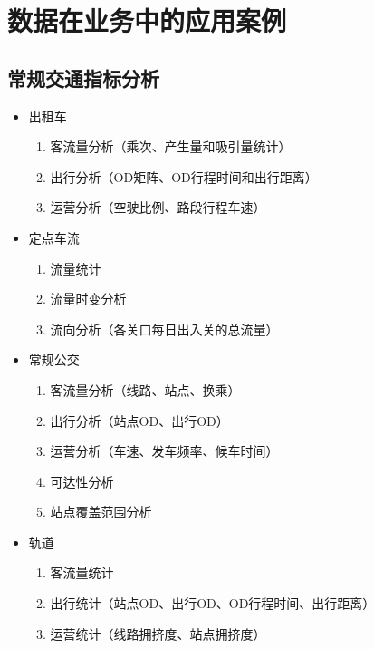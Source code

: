 
\section{数据在业务中的应用案例}

\subsection{常规交通指标分析}

\begin{frame}[t]{\subsecname}
  \begin{itemize}
     \item<1->出租车
        \begin{enumerate}
          \item 客流量分析（乘次、产生量和吸引量统计）
          \item 出行分析（OD矩阵、OD行程时间和出行距离）
          \item 运营分析（空驶比例、路段行程车速）
        \end{enumerate}
     \item<2->定点车流
        \begin{enumerate}
          \item 流量统计
          \item 流量时变分析
          \item 流向分析（各关口每日出入关的总流量）
        \end{enumerate}
     \item<3->常规公交
        \begin{enumerate}
          \item 客流量分析（线路、站点、换乘）
          \item 出行分析（站点OD、出行OD）
          \item 运营分析（车速、发车频率、候车时间）
          \item 可达性分析
          \item 站点覆盖范围分析
        \end{enumerate}
     \item<4->轨道
        \begin{enumerate}
          \item 客流量统计
          \item 出行统计（站点OD、出行OD、OD行程时间、出行距离）
          \item 运营统计（线路拥挤度、站点拥挤度）
        \end{enumerate}
  \end{itemize}
\end{frame}


